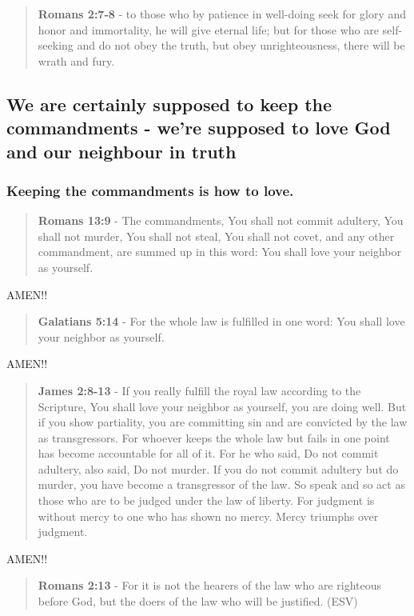 \documentclass[11pt]{article}
\begin{document}
\begin{quote}
\textbf{Romans 2:7-8} - to those who by patience in well-doing seek for glory and honor and immortality, he will give eternal life; but for those who are self-seeking and do not obey the truth, but obey unrighteousness, there will be wrath and fury.
\end{quote}

\subsection{We are certainly supposed to keep the commandments - we're supposed to love God and our neighbour in truth}
\label{sec:org1099b9a}
\subsubsection{Keeping the commandments is how to love.}
\label{sec:org3da996b}

\begin{quote}
\textbf{Romans 13:9} - The commandments, You shall not commit adultery, You shall not murder, You shall not steal, You shall not covet, and any other commandment, are summed up in this word: You shall love your neighbor as yourself.
\end{quote}

AMEN!!

\begin{quote}
\textbf{Galatians 5:14} - For the whole law is fulfilled in one word: You shall love your neighbor as yourself.
\end{quote}

AMEN!!

\begin{quote}
\textbf{James 2:8-13} - If you really fulfill the royal law according to the Scripture, You shall love your neighbor as yourself, you are doing well. But if you show partiality, you are committing sin and are convicted by the law as transgressors. For whoever keeps the whole law but fails in one point has become accountable for all of it. For he who said, Do not commit adultery, also said, Do not murder. If you do not commit adultery but do murder, you have become a transgressor of the law. So speak and so act as those who are to be judged under the law of liberty. For judgment is without mercy to one who has shown no mercy. Mercy triumphs over judgment.
\end{quote}

AMEN!!

\begin{quote}
\textbf{Romans 2:13} - For it is not the hearers of the law who are righteous before God, but the doers of the law who will be justified. (ESV)
\end{quote}
\end{document}

